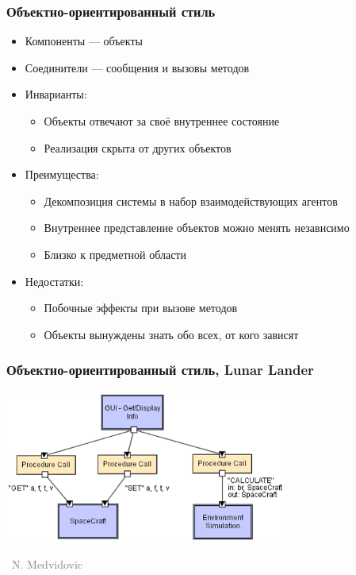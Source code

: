 \documentclass[xetex,mathserif,serif]{beamer}
\newcommand{\attribution}[1] {
    \vspace{-5mm}\begin{flushright}\begin{scriptsize}\textcolor{gray}{\textcopyright\, #1}\end{scriptsize}\end{flushright}
}
\begin{document}
    \begin{frame}
        \frametitle{Объектно-ориентированный стиль}
        \begin{itemize}
            \item Компоненты --- объекты
            \item Соединители --- сообщения и вызовы методов
            \item Инварианты:
            \begin{itemize}
                \item Объекты отвечают за своё внутреннее состояние
                \item Реализация скрыта от других объектов
            \end{itemize}
            \item Преимущества:
            \begin{itemize}
                \item Декомпозиция системы в набор взаимодействующих агентов
                \item Внутреннее представление объектов можно менять независимо
                \item Близко к предметной области
            \end{itemize}
            \item Недостатки:
            \begin{itemize}
                \item Побочные эффекты при вызове методов
                \item Объекты вынуждены знать обо всех, от кого зависят
            \end{itemize}
        \end{itemize}
    \end{frame}

    \begin{frame}
        \frametitle{Объектно-ориентированный стиль, Lunar Lander}
        \begin{center}
            \includegraphics[width=0.7\textwidth]{objectOrientedLL.png}
            \attribution{N. Medvidovic}
        \end{center}
    \end{frame}
\end{document}
